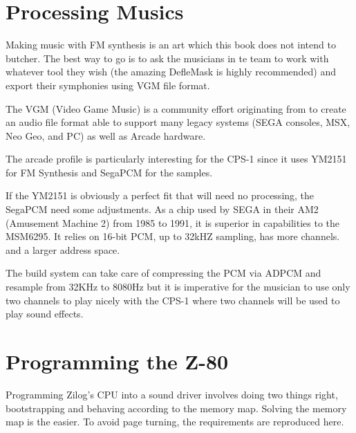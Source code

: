 \section{Processing Musics}
Making music with FM synthesis is an art which this book does not intend to butcher. The best way to go is to ask the musicians in te team to work with whatever tool they wish (the amazing DefleMask is highly recommended) and export their symphonies using VGM file format.

The VGM (Video Game Music) is a community effort originating from  to create an audio file format able to support many legacy systems (SEGA consoles, MSX, Neo Geo, and PC) as well as Arcade hardware.

The arcade profile is particularly interesting for the CPS-1 since it uses YM2151 for FM Synthesis and SegaPCM for the samples.

If the YM2151 is obviously a perfect fit that will need no processing, the SegaPCM need some adjustments. As a chip used by SEGA in their AM2 (Amusement Machine 2) from 1985 to 1991, it is superior in capabilities to the MSM6295. It relies on 16-bit PCM, up to 32kHZ sampling, has more channels. and a larger address space.

The build system can take care of compressing the PCM via ADPCM and resample from 32KHz to 8080Hz but it is imperative for the musician to use only two channels to play nicely with the CPS-1 where two channels will be used to play sound effects.






\section{Programming the Z-80}
Programming Zilog's CPU into a sound driver involves doing two things right, bootstrapping and behaving according to the memory map. Solving the memory map is the easier. To avoid page turning, the requirements are reproduced here.

